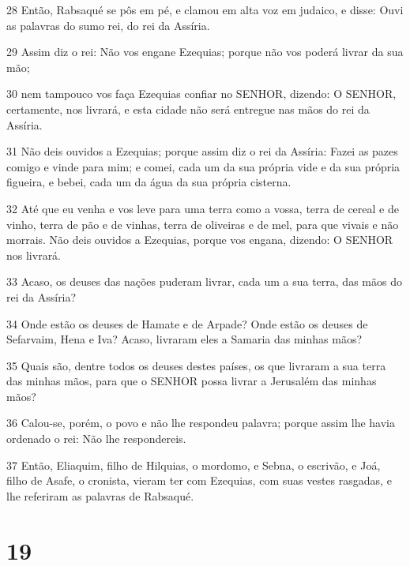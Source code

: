\par 28 Então, Rabsaqué se pôs em pé, e clamou em alta voz em judaico, e disse: Ouvi as palavras do sumo rei, do rei da Assíria.
\par 29 Assim diz o rei: Não vos engane Ezequias; porque não vos poderá livrar da sua mão;
\par 30 nem tampouco vos faça Ezequias confiar no SENHOR, dizendo: O SENHOR, certamente, nos livrará, e esta cidade não será entregue nas mãos do rei da Assíria.
\par 31 Não deis ouvidos a Ezequias; porque assim diz o rei da Assíria: Fazei as pazes comigo e vinde para mim; e comei, cada um da sua própria vide e da sua própria figueira, e bebei, cada um da água da sua própria cisterna.
\par 32 Até que eu venha e vos leve para uma terra como a vossa, terra de cereal e de vinho, terra de pão e de vinhas, terra de oliveiras e de mel, para que vivais e não morrais. Não deis ouvidos a Ezequias, porque vos engana, dizendo: O SENHOR nos livrará.
\par 33 Acaso, os deuses das nações puderam livrar, cada um a sua terra, das mãos do rei da Assíria?
\par 34 Onde estão os deuses de Hamate e de Arpade? Onde estão os deuses de Sefarvaim, Hena e Iva? Acaso, livraram eles a Samaria das minhas mãos?
\par 35 Quais são, dentre todos os deuses destes países, os que livraram a sua terra das minhas mãos, para que o SENHOR possa livrar a Jerusalém das minhas mãos?
\par 36 Calou-se, porém, o povo e não lhe respondeu palavra; porque assim lhe havia ordenado o rei: Não lhe respondereis.
\par 37 Então, Eliaquim, filho de Hilquias, o mordomo, e Sebna, o escrivão, e Joá, filho de Asafe, o cronista, vieram ter com Ezequias, com suas vestes rasgadas, e lhe referiram as palavras de Rabsaqué.

\chapter{19}

